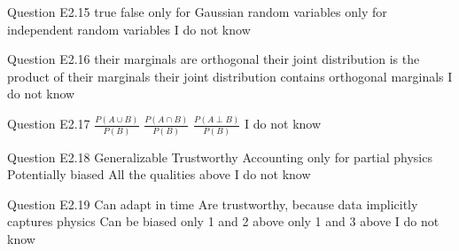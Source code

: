 \begin{frame}{Question E2.15}
	\QuestionNotes{}
	\QuestionAnswers
	{
		\answer true
		\answer false
		\answer only for Gaussian random variables
		\correctanswer only for independent random variables
		\answer I do not know
	}
\end{frame}


\begin{frame}{Question E2.16}
	\QuestionNotes{}
	\QuestionAnswers
	{
		\answer their marginals are orthogonal
		\correctanswer their joint distribution is the product of their marginals
		\answer their joint distribution contains orthogonal marginals
		\answer I do not know
	}
\end{frame}


\begin{frame}{Question E2.17}
	\QuestionNotes{}
	\QuestionAnswers
	{
		\answer $\frac{P(A \cup B)}{P(B)}$
		\correctanswer $\frac{P(A \cap B)}{P(B)}$
		\answer $\frac{P(A \perp B)}{P(B)}$
		\answer I do not know
	}
\end{frame}


\begin{frame}{Question E2.18}
	\QuestionNotes{}
	\QuestionAnswers
	{
		\answer Generalizable
		\answer Trustworthy
		\answer Accounting only for partial physics
		\answer Potentially biased
		\correctanswer All the qualities above
		\answer I do not know
	}
\end{frame}


\begin{frame}{Question E2.19}
	\QuestionNotes{}
	\QuestionAnswers
	{
		\answer Can adapt in time
		\answer Are trustworthy, because data implicitly captures physics
		\answer Can be biased
		\answer only 1 and 2 above
		\correctanswer only 1 and 3 above
		\answer I do not know
	}
\end{frame}

